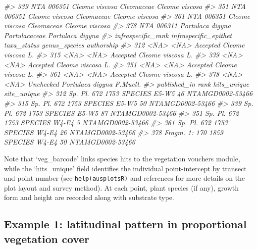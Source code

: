 \documentclass[
]{article}
\newenvironment{Shaded}{\begin{snugshade}}{\end{snugshade}}
\newcommand{\CommentTok}[1]{\textcolor[rgb]{0.56,0.35,0.01}{\textit{#1}}}
\begin{document}
\begin{Shaded}
\begin{Highlighting}[]
\CommentTok{#> 339 NTA  006351    Cleome viscosa    Cleomaceae    Cleome          viscosa}
\CommentTok{#> 351 NTA  006351    Cleome viscosa    Cleomaceae    Cleome          viscosa}
\CommentTok{#> 361 NTA  006351    Cleome viscosa    Cleomaceae    Cleome          viscosa}
\CommentTok{#> 378 NTA  006311  Portulaca digyna Portulacaceae Portulaca           digyna}
\CommentTok{#>     infraspecific_rank infraspecific_epithet taxa_status    genus_species authorship}
\CommentTok{#> 312               <NA>                  <NA>    Accepted   Cleome viscosa         L.}
\CommentTok{#> 315               <NA>                  <NA>    Accepted   Cleome viscosa         L.}
\CommentTok{#> 339               <NA>                  <NA>    Accepted   Cleome viscosa         L.}
\CommentTok{#> 351               <NA>                  <NA>    Accepted   Cleome viscosa         L.}
\CommentTok{#> 361               <NA>                  <NA>    Accepted   Cleome viscosa         L.}
\CommentTok{#> 378               <NA>                  <NA>   Unchecked Portulaca digyna   F.Muell.}
\CommentTok{#>           published_in    rank hits_unique      site_unique}
\CommentTok{#> 312   Sp. Pl. 672 1753 SPECIES    E5-W5 46 NTAMGD0002-53466}
\CommentTok{#> 315   Sp. Pl. 672 1753 SPECIES    E5-W5 50 NTAMGD0002-53466}
\CommentTok{#> 339   Sp. Pl. 672 1753 SPECIES    E5-W5 87 NTAMGD0002-53466}
\CommentTok{#> 351   Sp. Pl. 672 1753 SPECIES     W4-E4 5 NTAMGD0002-53466}
\CommentTok{#> 361   Sp. Pl. 672 1753 SPECIES    W4-E4 26 NTAMGD0002-53466}
\CommentTok{#> 378 Fragm. 1: 170 1859 SPECIES    W4-E4 50 NTAMGD0002-53466}
\end{Highlighting}
\end{Shaded}

Note that `veg\_barcode' links species hits to the vegetation vouchers
module, while the `hits\_unique' field identifies the individual
point-intercept by transect and point number (see
\texttt{help(ausplotsR)} and references for more details on the plot
layout and survey method). At each point, plant species (if any), growth
form and height are recorded along with substrate type.

\hypertarget{example-1-latitudinal-pattern-in-proportional-vegetation-cover}{%
\subsection{Example 1: latitudinal pattern in proportional vegetation
cover}\label{example-1-latitudinal-pattern-in-proportional-vegetation-cover}}
\end{document}
